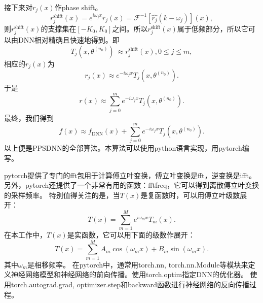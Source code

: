 接下来对$r_j(x)$作phase shift。
\begin{equation}
r_{j}^{\text{shift}}(x)=e^{i\omega_jx}r_j(x)=\mathcal{F}^{-1}\left[  \widehat{r_{j}}(k-\omega
_{j})\right]  (x),\label{rjshift}%
\end{equation}
则$r_{j}^{\text{shift}}(x)$的支撑集在$[-K_0,K_0]$之间。所以$r_{j}^{\text{shift}}(x)$属于低频部分，所以它可以由DNN相对精确且快速地得到。即
\begin{equation}
T_{j}(x,\theta^{(n_{0})})\ \approx r_{j}^{\text{shift}}(x),0\leq j\leq m,
\end{equation}
相应的$r_j(x)$为
\begin{equation}
r_{j}(x)\approx e^{-i\omega_{j}x}T_{j}(x,\theta^{(n_{0})}).
\end{equation}
于是
\begin{equation}
r(x)\approx%
{\displaystyle\sum\limits_{j=0}^{m}}
e^{-i\omega_{j}x}T_{j}(x,\theta^{(n_{0})}).
\end{equation}
最终，我们得到
\begin{equation}
f(x) \approx f_{\text{DNN}}(x)+%
{\displaystyle\sum\limits_{j=0}^{m}}
e^{-i\omega_{j}x}T_{j}(x,\theta^{(n_{0})}). \label{DNNupdate}%
\end{equation}
以上便是PPSDNN的全部算法。本算法可以使用python语言实现，用pytorch\cite{ketkar2021introduction}编写。

pytorch提供了专门的fft包用于计算傅立叶变换，傅立叶变换是fft，逆变换是ifft。另外，pytorch还提供了一个非常有用的函数：fftfreq，它可以得到离散傅立叶变换的采样频率。
特别值得关注的是，当$T(x)$是复函数时，可以用傅立叶级数展开：
\begin{equation}\label{}
    T(x)=\sum_{m=1}^{M} e^{i \omega_{m} x} T_{m}(x).
\end{equation}
在本工作中，$T(x)$是实函数，它可以用下面的级数作展开：
\begin{equation}\label{}
    T(x)=\sum_{m=1}^{M} A_{m} \cos \left(\omega_{m} x\right)+B_{m} \sin \left(\omega_{m} x\right).
\end{equation}
其中$\omega_{m}$是相移频率。
在pytorch中，通常用torch.nn, torch.nn.Module等模块来定义神经网络模型和神经网络的前向传播。使用torch.optim指定DNN的优化器。
使用torch.autograd.grad, optimizer.step和backward函数进行神经网络的反向传播过程。

